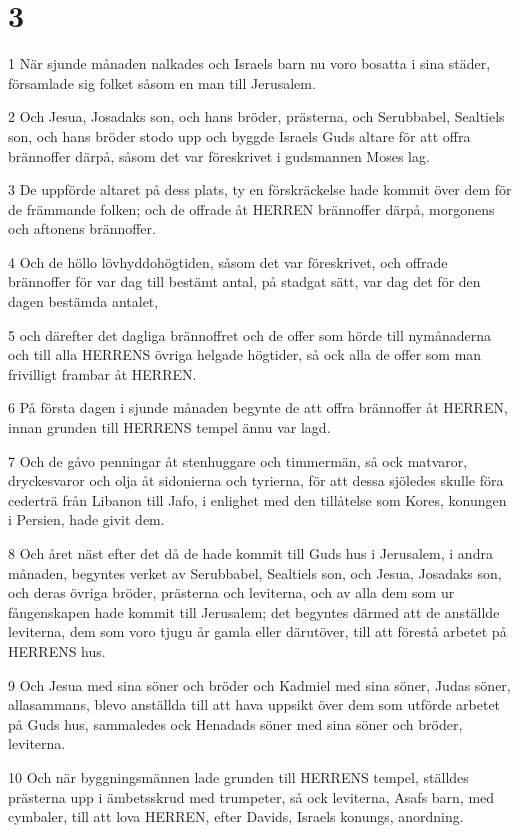\chapter{3}

\par 1 När sjunde månaden nalkades och Israels barn nu voro bosatta i sina städer, församlade sig folket såsom en man till Jerusalem.
\par 2 Och Jesua, Josadaks son, och hans bröder, prästerna, och Serubbabel, Sealtiels son, och hans bröder stodo upp och byggde Israels Guds altare för att offra brännoffer därpå, såsom det var föreskrivet i gudsmannen Moses lag.
\par 3 De uppförde altaret på dess plats, ty en förskräckelse hade kommit över dem för de främmande folken; och de offrade åt HERREN brännoffer därpå, morgonens och aftonens brännoffer.
\par 4 Och de höllo lövhyddohögtiden, såsom det var föreskrivet, och offrade brännoffer för var dag till bestämt antal, på stadgat sätt, var dag det för den dagen bestämda antalet,
\par 5 och därefter det dagliga brännoffret och de offer som hörde till nymånaderna och till alla HERRENS övriga helgade högtider, så ock alla de offer som man frivilligt frambar åt HERREN.
\par 6 På första dagen i sjunde månaden begynte de att offra brännoffer åt HERREN, innan grunden till HERRENS tempel ännu var lagd.
\par 7 Och de gåvo penningar åt stenhuggare och timmermän, så ock matvaror, dryckesvaror och olja åt sidonierna och tyrierna, för att dessa sjöledes skulle föra cederträ från Libanon till Jafo, i enlighet med den tillåtelse som Kores, konungen i Persien, hade givit dem.
\par 8 Och året näst efter det då de hade kommit till Guds hus i Jerusalem, i andra månaden, begyntes verket av Serubbabel, Sealtiels son, och Jesua, Josadaks son, och deras övriga bröder, prästerna och leviterna, och av alla dem som ur fångenskapen hade kommit till Jerusalem; det begyntes därmed att de anställde leviterna, dem som voro tjugu år gamla eller därutöver, till att förestå arbetet på HERRENS hus.
\par 9 Och Jesua med sina söner och bröder och Kadmiel med sina söner, Judas söner, allasammans, blevo anställda till att hava uppsikt över dem som utförde arbetet på Guds hus, sammaledes ock Henadads söner med sina söner och bröder, leviterna.
\par 10 Och när byggningsmännen lade grunden till HERRENS tempel, ställdes prästerna upp i ämbetsskrud med trumpeter, så ock leviterna, Asafs barn, med cymbaler, till att lova HERREN, efter Davids, Israels konungs, anordning.
